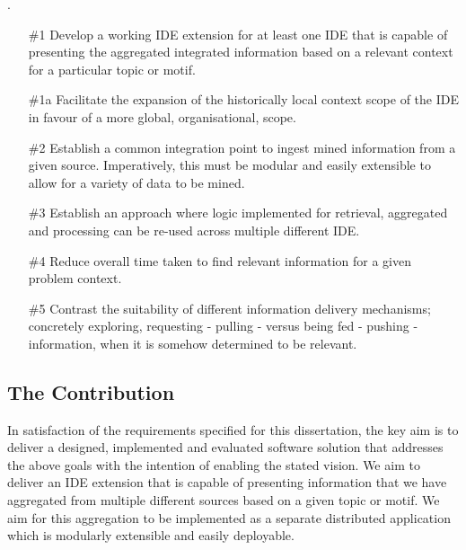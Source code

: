 \label{Objectives}.
\begin{enumerate}
	
	\label{objective:1}
	\item[\#1] Develop a working IDE extension for at least one IDE that is capable of presenting the aggregated integrated information based on a relevant context for a particular topic or motif. 
	
	\item[\#1a] Facilitate the expansion of the historically local context scope of the IDE in favour of a more global, organisational, scope.
	
	\label{objective:2}
	\item[\#2] Establish a common integration point to ingest mined information from a given source. Imperatively, this must be modular and easily extensible to allow for a variety of data to be mined.
	
	\label{objective:3}
	\item[\#3] Establish an approach where logic implemented for retrieval, aggregated and processing can be re-used across multiple different IDE.
	
	\label{objective:4}
	\item[\#4] Reduce overall time taken to find relevant information for a given problem context.
	
	\label{objective:5}
	\item[\#5] Contrast the suitability of different information delivery mechanisms; concretely exploring, requesting - pulling - versus being fed - pushing - information, when it is somehow determined to be relevant. 
	
\end{enumerate}

\subsection{The Contribution}

In satisfaction of the requirements specified for this dissertation, the key aim is to deliver a designed, implemented and evaluated software solution that addresses the above goals with the intention of enabling the stated vision. We aim to deliver an IDE extension that is capable of presenting information that we have aggregated from multiple different sources based on a given topic or motif. We aim for this aggregation to be implemented as a separate distributed application which is modularly extensible and easily deployable.